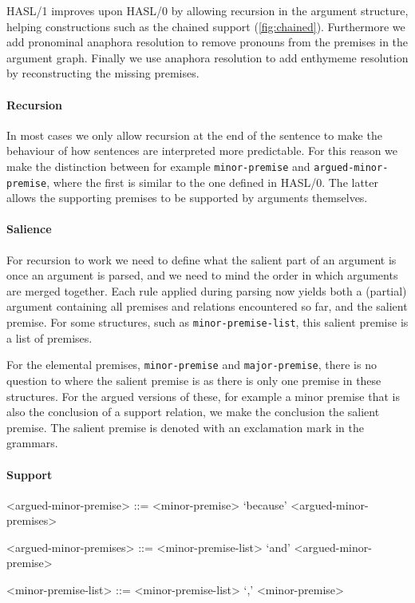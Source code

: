 HASL/1 improves upon HASL/0 by allowing recursion in the argument structure, helping constructions such as the chained support (\autoref{fig:chained}). Furthermore we add pronominal anaphora resolution to remove pronouns from the premises in the argument graph. Finally we use anaphora resolution to add enthymeme resolution by reconstructing the missing premises.

\paragraph{Recursion}
In most cases we only allow recursion at the end of the sentence to make the behaviour of how sentences are interpreted more predictable. For this reason we make the distinction between for example \texttt{minor-premise} and \texttt{argued-minor-premise}, where the first is similar to the one defined in HASL/0. The latter allows the supporting premises to be supported by arguments themselves.

\paragraph{Salience}
For recursion to work we need to define what the salient part of an argument is once an argument is parsed, and we need to mind the order in which arguments are merged together. Each rule applied during parsing now yields both a (partial) argument containing all premises and relations encountered so far, and the salient premise. For some structures, such as \texttt{minor-premise-list}, this salient premise is a list of premises.

For the elemental premises, \texttt{minor-premise} and \texttt{major-premise}, there is no question to where the salient premise is as there is only one premise in these structures. For the argued versions of these, for example a minor premise that is also the conclusion of a support relation, we make the conclusion the salient premise. The salient premise is denoted with an exclamation mark in the grammars.

\paragraph{Support}
\begin{grammar}
<argued-minor-premise> ::= <minor-premise> `because' <argued-minor-premises> %

<argued-minor-premises> ::= <minor-premise-list> `and' <argued-minor-premise>

<minor-premise-list> ::= <minor-premise-list> `,' <minor-premise>
\end{grammar}

